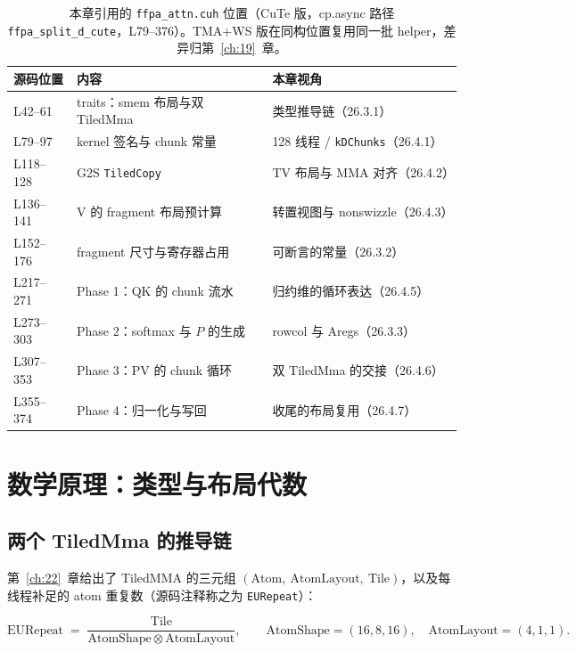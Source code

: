 \begin{table}[htbp]
\centering
\caption{本章引用的 \texttt{ffpa\_\allowbreak{}attn.\allowbreak{}cuh} 位置（CuTe 版，cp.async 路径
\texttt{ffpa\_\allowbreak{}split\_\allowbreak{}d\_\allowbreak{}cute}，L79--376）。TMA+WS 版在同构位置复用同一批
helper，差异归第~\ref{ch:19}~章。}
\label{tab:26-code}
\begin{tabular}{p{4.2cm}p{3.4cm}p{6.0cm}}
\toprule
源码位置 & 内容 & 本章视角 \\
\midrule
L42--61 & traits：smem 布局与双 TiledMma & 类型推导链（26.3.1） \\
L79--97 & kernel 签名与 chunk 常量 & 128 线程 / \texttt{kDChunks}（26.4.1） \\
L118--128 & G2S \texttt{TiledCopy} & TV 布局与 MMA 对齐（26.4.2） \\
L136--141 & V 的 fragment 布局预计算 & 转置视图与 nonswizzle（26.4.3） \\
L152--176 & fragment 尺寸与寄存器占用 & 可断言的常量（26.3.2） \\
L217--271 & Phase 1：QK 的 chunk 流水 & 归约维的循环表达（26.4.5） \\
L273--303 & Phase 2：softmax 与 $P$ 的生成 & rowcol 与 Aregs（26.3.3） \\
L307--353 & Phase 3：PV 的 chunk 循环 & 双 TiledMma 的交接（26.4.6） \\
L355--374 & Phase 4：归一化与写回 & 收尾的布局复用（26.4.7） \\
\bottomrule
\end{tabular}
\end{table}

\section{数学原理：类型与布局代数}

\subsection{两个 TiledMma 的推导链}

第~\ref{ch:22}~章给出了 TiledMMA 的三元组
$(\mathrm{Atom},\ \mathrm{AtomLayout},\ \mathrm{Tile})$，以及每线程补足的
atom 重复数（源码注释称之为 \texttt{EURepeat}）：

\begin{equation}
  \mathrm{EURepeat} \;=\; \frac{\mathrm{Tile}}
  {\mathrm{AtomShape}\otimes \mathrm{AtomLayout}} ,
  \qquad
  \mathrm{AtomShape} = (16,8,16),\quad \mathrm{AtomLayout} = (4,1,1).
  \label{eq:26-eurepeat}
\end{equation}

